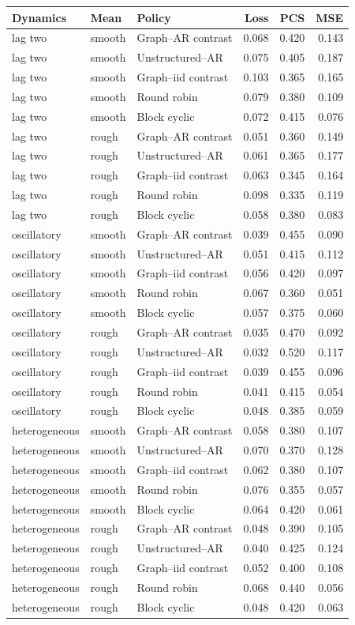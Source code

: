 \begin{tabular}{lllrrr}
\toprule
Dynamics & Mean & Policy & Loss & PCS & MSE \\
\midrule
lag two & smooth & Graph--AR contrast & 0.068 & 0.420 & 0.143 \\
lag two & smooth & Unstructured--AR & 0.075 & 0.405 & 0.187 \\
lag two & smooth & Graph--iid contrast & 0.103 & 0.365 & 0.165 \\
lag two & smooth & Round robin & 0.079 & 0.380 & 0.109 \\
lag two & smooth & Block cyclic & 0.072 & 0.415 & 0.076 \\
lag two & rough & Graph--AR contrast & 0.051 & 0.360 & 0.149 \\
lag two & rough & Unstructured--AR & 0.061 & 0.365 & 0.177 \\
lag two & rough & Graph--iid contrast & 0.063 & 0.345 & 0.164 \\
lag two & rough & Round robin & 0.098 & 0.335 & 0.119 \\
lag two & rough & Block cyclic & 0.058 & 0.380 & 0.083 \\
oscillatory & smooth & Graph--AR contrast & 0.039 & 0.455 & 0.090 \\
oscillatory & smooth & Unstructured--AR & 0.051 & 0.415 & 0.112 \\
oscillatory & smooth & Graph--iid contrast & 0.056 & 0.420 & 0.097 \\
oscillatory & smooth & Round robin & 0.067 & 0.360 & 0.051 \\
oscillatory & smooth & Block cyclic & 0.057 & 0.375 & 0.060 \\
oscillatory & rough & Graph--AR contrast & 0.035 & 0.470 & 0.092 \\
oscillatory & rough & Unstructured--AR & 0.032 & 0.520 & 0.117 \\
oscillatory & rough & Graph--iid contrast & 0.039 & 0.455 & 0.096 \\
oscillatory & rough & Round robin & 0.041 & 0.415 & 0.054 \\
oscillatory & rough & Block cyclic & 0.048 & 0.385 & 0.059 \\
heterogeneous & smooth & Graph--AR contrast & 0.058 & 0.380 & 0.107 \\
heterogeneous & smooth & Unstructured--AR & 0.070 & 0.370 & 0.128 \\
heterogeneous & smooth & Graph--iid contrast & 0.062 & 0.380 & 0.107 \\
heterogeneous & smooth & Round robin & 0.076 & 0.355 & 0.057 \\
heterogeneous & smooth & Block cyclic & 0.064 & 0.420 & 0.061 \\
heterogeneous & rough & Graph--AR contrast & 0.048 & 0.390 & 0.105 \\
heterogeneous & rough & Unstructured--AR & 0.040 & 0.425 & 0.124 \\
heterogeneous & rough & Graph--iid contrast & 0.052 & 0.400 & 0.108 \\
heterogeneous & rough & Round robin & 0.068 & 0.440 & 0.056 \\
heterogeneous & rough & Block cyclic & 0.048 & 0.420 & 0.063 \\
\bottomrule
\end{tabular}

